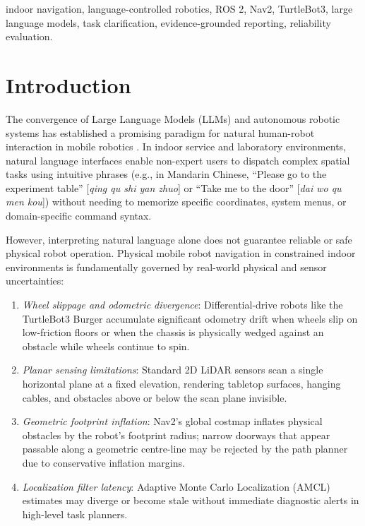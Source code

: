 \documentclass[conference]{IEEEtran}
\begin{document}
\begin{IEEEkeywords}
indoor navigation, language-controlled robotics, ROS 2, Nav2, TurtleBot3, large language models, task clarification, evidence-grounded reporting, reliability evaluation.
\end{IEEEkeywords}

\section{Introduction}

The convergence of Large Language Models (LLMs) and autonomous robotic systems has established a promising paradigm for natural human-robot interaction in mobile robotics \cite{Yao2023react, Ahn2022saycan}. In indoor service and laboratory environments, natural language interfaces enable non-expert users to dispatch complex spatial tasks using intuitive phrases (e.g., in Mandarin Chinese, ``Please go to the experiment table'' [\textit{qing qu shi yan zhuo}] or ``Take me to the door'' [\textit{dai wo qu men kou}]) without needing to memorize specific coordinates, system menus, or domain-specific command syntax.

However, interpreting natural language alone does not guarantee reliable or safe physical robot operation. Physical mobile robot navigation in constrained indoor environments is fundamentally governed by real-world physical and sensor uncertainties:
\begin{enumerate}
    \item \textit{Wheel slippage and odometric divergence}: Differential-drive robots like the TurtleBot3 Burger accumulate significant odometry drift when wheels slip on low-friction floors or when the chassis is physically wedged against an obstacle while wheels continue to spin.
    \item \textit{Planar sensing limitations}: Standard 2D LiDAR sensors scan a single horizontal plane at a fixed elevation, rendering tabletop surfaces, hanging cables, and obstacles above or below the scan plane invisible.
    \item \textit{Geometric footprint inflation}: Nav2's global costmap inflates physical obstacles by the robot's footprint radius; narrow doorways that appear passable along a geometric centre-line may be rejected by the path planner due to conservative inflation margins.
    \item \textit{Localization filter latency}: Adaptive Monte Carlo Localization (AMCL) estimates may diverge or become stale without immediate diagnostic alerts in high-level task planners.
\end{enumerate}
\end{document}
